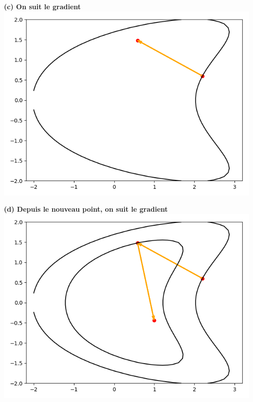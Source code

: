 \documentclass[11pt,class=report,crop=false]{standalone}
\begin{document}
\begin{center}
\begin{minipage}{0.48\textwidth}
\begin{center}
{\bf (c) On suit le gradient}
\includegraphics[scale=\myscale,scale=0.5]{figures/descente_intro_03}
\end{center}
\end{minipage}
\begin{minipage}{0.48\textwidth}
\begin{center}
{\bf (d) Depuis le nouveau point, on suit le gradient}
\includegraphics[scale=\myscale,scale=0.5]{figures/descente_intro_04}
\end{center}
\end{minipage}
\end{center}
\end{document}
